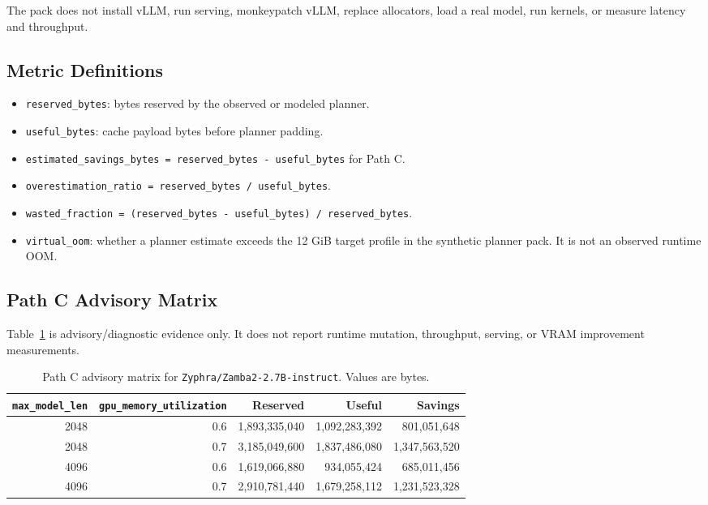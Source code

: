 \documentclass[11pt]{article}
\begin{document}
The pack does not install vLLM, run serving, monkeypatch vLLM, replace
allocators, load a real model, run kernels, or measure latency and throughput.

\subsection{Metric Definitions}

\begin{itemize}
\item \texttt{reserved\_bytes}: bytes reserved by the observed or modeled
planner.
\item \texttt{useful\_bytes}: cache payload bytes before planner padding.
\item \texttt{estimated\_savings\_bytes = reserved\_bytes - useful\_bytes} for
Path C.
\item \texttt{overestimation\_ratio = reserved\_bytes / useful\_bytes}.
\item \texttt{wasted\_fraction = (reserved\_bytes - useful\_bytes) /
reserved\_bytes}.
\item \texttt{virtual\_oom}: whether a planner estimate exceeds the 12 GiB
target profile in the synthetic planner pack. It is not an observed runtime
OOM.
\end{itemize}

\subsection{Path C Advisory Matrix}

Table~\ref{tab:path-c-matrix} is advisory/diagnostic evidence only. It does not
report runtime mutation, throughput, serving, or VRAM improvement measurements.

\begin{table}[ht]
\centering
\small
\begin{tabular}{rrrrr}
\hline
\texttt{max\_model\_len} & \texttt{gpu\_memory\_utilization} & Reserved & Useful & Savings \\
\hline
2048 & 0.6 & 1,893,335,040 & 1,092,283,392 & 801,051,648 \\
2048 & 0.7 & 3,185,049,600 & 1,837,486,080 & 1,347,563,520 \\
4096 & 0.6 & 1,619,066,880 & 934,055,424 & 685,011,456 \\
4096 & 0.7 & 2,910,781,440 & 1,679,258,112 & 1,231,523,328 \\
\hline
\end{tabular}
\caption{Path C advisory matrix for \texttt{Zyphra/Zamba2-2.7B-instruct}. Values are bytes.}
\label{tab:path-c-matrix}
\end{table}
\end{document}
